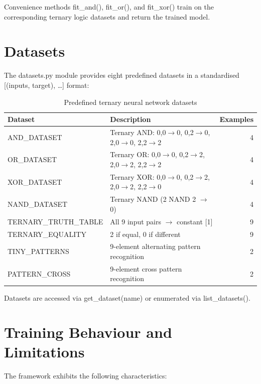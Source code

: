 \documentclass[12pt,a4paper,twoside]{book}
\theoremstyle{trinarytheorem}
\theoremstyle{trinarydefinition}
\newcommand{\code}[1]{\textsf{#1}}
\begin{document}
Convenience methods \code{fit\_and()}, \code{fit\_or()}, and
\code{fit\_xor()} train on the corresponding ternary logic datasets
and return the trained model.

\section{Datasets}

The \code{datasets.py} module provides eight predefined datasets in a
standardised \code{[(inputs, target), \ldots]} format:

\begin{table}[H]
\centering
\caption{Predefined ternary neural network datasets}
\label{tab:nndatasets}
\begin{tabular}{llr}
\toprule
Dataset & Description & Examples \\
\midrule
\code{AND\_DATASET}    & Ternary AND: 0,0$\rightarrow$0, 0,2$\rightarrow$0, 2,0$\rightarrow$0, 2,2$\rightarrow$2 & 4 \\
\code{OR\_DATASET}     & Ternary OR: 0,0$\rightarrow$0, 0,2$\rightarrow$2, 2,0$\rightarrow$2, 2,2$\rightarrow$2  & 4 \\
\code{XOR\_DATASET}    & Ternary XOR: 0,0$\rightarrow$0, 0,2$\rightarrow$2, 2,0$\rightarrow$2, 2,2$\rightarrow$0 & 4 \\
\code{NAND\_DATASET}   & Ternary NAND (2 NAND 2 $\rightarrow$ 0) & 4 \\
\code{TERNARY\_TRUTH\_TABLE} & All 9 input pairs $\rightarrow$ constant [1] & 9 \\
\code{TERNARY\_EQUALITY}    & 2 if equal, 0 if different & 9 \\
\code{TINY\_PATTERNS}  & 9-element alternating pattern recognition & 2 \\
\code{PATTERN\_CROSS}  & 9-element cross pattern recognition & 2 \\
\bottomrule
\end{tabular}
\end{table}

Datasets are accessed via \code{get\_dataset(name)} or enumerated via
\code{list\_datasets()}.

\section{Training Behaviour and Limitations}

The framework exhibits the following characteristics:
\end{document}
